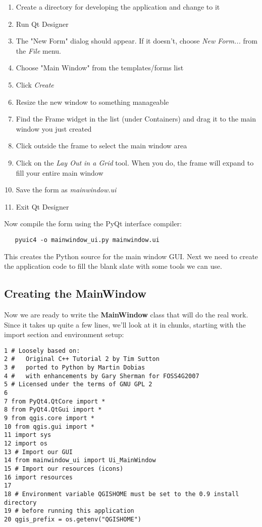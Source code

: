 \begin{enumerate}
\item Create a directory for developing the application and change to it
\item Run Qt Designer
\item The "New Form" dialog should appear. If it doesn't, choose
\textsl{New Form...} from the \textsl{File} menu.
\item Choose "Main Window" from the templates/forms list
\item Click \textsl{Create} 
\item Resize the new window to something manageable
\item Find the Frame widget in the list (under Containers) and drag it to
the main window you just created
\item Click outside the frame to select the main window area 
\item Click on the \textsl{Lay Out in a Grid} tool. When you do, the frame
will expand to fill your entire main window
\item Save the form as \textsl{mainwindow.ui} 
\item Exit Qt Designer
\end{enumerate} 

Now compile the form using the PyQt interface compiler:

\begin{verbatim}
   pyuic4 -o mainwindow_ui.py mainwindow.ui
\end{verbatim}

This creates the Python source for the main window GUI. Next we need to create
the application code to fill the blank slate with some tools we can use.

\subsection{Creating the MainWindow}

Now we are ready to write the \textbf{MainWindow} class that will do the real work.
Since it takes up quite a few lines, we'll look at it in chunks, starting
with the import section and environment setup:

\begin{verbatim}
1 # Loosely based on:
2 #   Original C++ Tutorial 2 by Tim Sutton
3 #   ported to Python by Martin Dobias
4 #   with enhancements by Gary Sherman for FOSS4G2007
5 # Licensed under the terms of GNU GPL 2
6
7 from PyQt4.QtCore import *
8 from PyQt4.QtGui import *
9 from qgis.core import *
10 from qgis.gui import *
11 import sys
12 import os
13 # Import our GUI
14 from mainwindow_ui import Ui_MainWindow
15 # Import our resources (icons)
16 import resources
17 
18 # Environment variable QGISHOME must be set to the 0.9 install directory
19 # before running this application
20 qgis_prefix = os.getenv("QGISHOME")
\end{verbatim}


